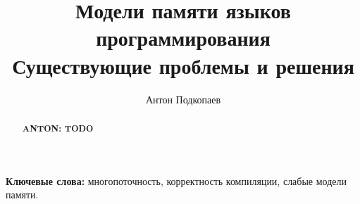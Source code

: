 \documentclass[12pt]{article}
\title{Модели памяти языков программирования\\ {\Large Существующие проблемы и решения}}
\author{Антон Подкопаев}
\affil{СПбГУ, JetBrains Research, Россия}
\theoremstyle{plain}
\newcommand{\app}[1]{{\color{blue}\textbf{ANTON: #1}}}
\begin{document}
\maketitle

\begin{abstract}
  \app{TODO}
\end{abstract}

{\bf Ключевые слова:} многопоточность, корректность компиляции, слабые модели памяти.


\newpage



\end{document}
